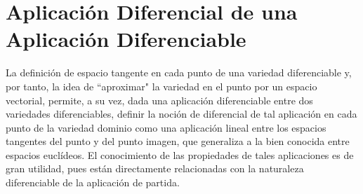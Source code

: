 \documentclass[Cursovd_portada.tex]{subfiles}
\begin{document}
\chapter{Aplicación Diferencial de una\\ Aplicación
Diferenciable}
 \hs La definición de espacio tangente en cada
punto de una variedad diferenciable y, por tanto, la idea de
``aproximar" la variedad en el punto por un espacio vectorial,
permite, a su vez, dada una aplicación diferenciable entre dos
variedades diferenciables, definir la noción de diferencial de
tal aplicación en cada punto de la variedad dominio como una
aplicación lineal entre los espacios tangentes del punto y del
punto imagen, que generaliza a la bien conocida entre espacios
euclídeos. El conocimiento de las propiedades de tales
aplicaciones es de gran utilidad, pues están directamente
relacionadas con la naturaleza diferenciable de la aplicación
de partida.
\end{document}
